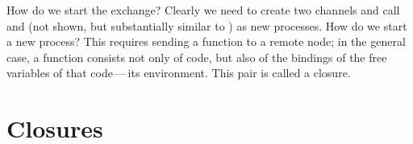 \documentclass[preprint]{sigplanconf}
\begin{document}
How do we start the exchange? Clearly we need to create two channels and call  and  (not shown, but substantially similar to ) as new processes. 
How do we start a new process?
This requires sending a function to a remote node; in the general case, a function consists not only of code, but also of the bindings of the free variables of that code\,---\,its environment.
This  pair is called a closure.

\section{Closures}
\label{Closures}

\end{document}
